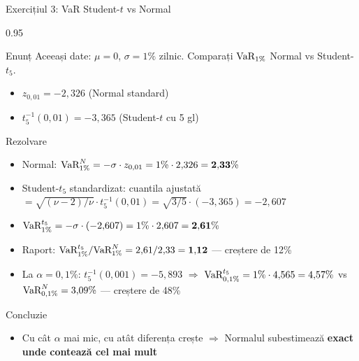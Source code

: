 \documentclass[9pt, aspectratio=169, t]{beamer}
\begin{document}
\begin{frame}[shrink=10]{Exercițiul 3: VaR Student-$t$ vs Normal}
    \begin{cminipage}{0.95\textwidth}
    \begin{block}{Enunț}
    Aceeași date: $\mu = 0$, $\sigma = 1\%$ zilnic. Comparați $\text{VaR}_{1\%}$ Normal vs Student-$t_5$.
    \begin{itemize}\setlength{\itemsep}{0pt}
        \item $z_{0{,}01} = -2{,}326$ (Normal standard)
        \item $t_5^{-1}(0{,}01) = -3{,}365$ (Student-$t$ cu 5 gl)
    \end{itemize}
    \end{block}
    \vspace{0.1cm}
    \begin{exampleblock}{Rezolvare}
    \begin{itemize}\setlength{\itemsep}{0pt}
        \item Normal: $\text{VaR}^{N}_{1\%} = -\sigma \cdot z_{0{,}01} = 1\% \cdot 2{,}326 = \mathbf{2{,}33\%}$
        \item Student-$t_5$ standardizat: cuantila ajustată $= \sqrt{(\nu-2)/\nu} \cdot t_5^{-1}(0{,}01) = \sqrt{3/5} \cdot (-3{,}365) = -2{,}607$
        \item $\text{VaR}^{t_5}_{1\%} = -\sigma \cdot (-2{,}607) = 1\% \cdot 2{,}607 = \mathbf{2{,}61\%}$
        \item Raport: $\text{VaR}^{t_5}_{1\%}/\text{VaR}^{N}_{1\%} = 2{,}61/2{,}33 = \mathbf{1{,}12}$ --- creștere de 12\%
        \item La $\alpha = 0{,}1\%$: $t_5^{-1}(0{,}001) = -5{,}893$ $\Rightarrow$ $\text{VaR}^{t_5}_{0{,}1\%} = 1\% \cdot 4{,}565 = 4{,}57\%$ vs $\text{VaR}^{N}_{0{,}1\%} = 3{,}09\%$ --- creștere de 48\%
    \end{itemize}
    \end{exampleblock}
    \begin{alertblock}{Concluzie}
    \begin{itemize}\setlength{\itemsep}{0pt}
        \item Cu cât $\alpha$ mai mic, cu atât diferența crește $\Rightarrow$ Normalul subestimează \textbf{exact unde contează cel mai mult}
    \end{itemize}
    \end{alertblock}
    \end{cminipage}
\end{frame}
\end{document}
